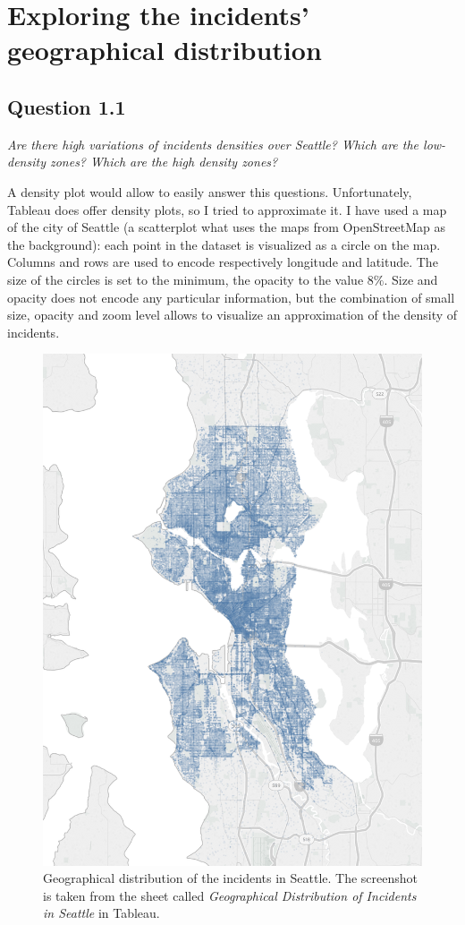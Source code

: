 \section{Exploring the incidents' geographical distribution}

\subsection*{Question 1.1}
\textit{Are there high variations of incidents densities over Seattle? Which are the low-density zones? Which are the high density zones?}

A density plot would allow to easily answer this questions.
Unfortunately, Tableau does offer density plots, so I tried to approximate it.
I have used a map of the city of Seattle (a scatterplot what uses the maps from OpenStreetMap as the background):
each point in the dataset is visualized as a circle on the map.
Columns and rows are used to encode respectively longitude and latitude.
The size of the circles is set to the minimum, the opacity to the value $8\%$.
Size and opacity does not encode any particular information, but the combination of small size, opacity and zoom level allows to visualize an approximation of the density of incidents.

\begin{figure}[h]
	\centering
	\includegraphics[width=.75\columnwidth]{figures/1_1_geographical_distribution_incidents}
	\caption{Geographical distribution of the incidents in Seattle. The screenshot is taken from the sheet called \textit{Geographical Distribution of Incidents in Seattle} in Tableau.}
	\label{fig:1_1_geographical_distribution_incidents}
\end{figure}

